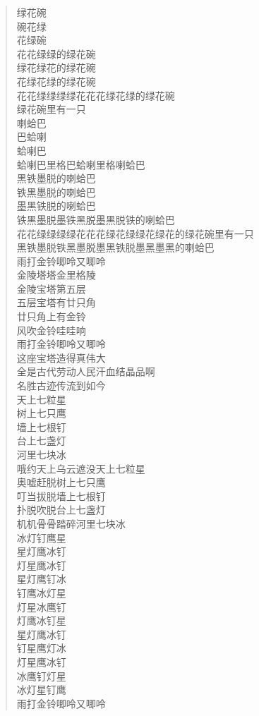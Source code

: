 \documentclass[UTF8]{ctexart}
\begin{document}
\begin{verse}
绿花碗  \\
碗花绿 \\
花绿碗 \\
花花绿绿的绿花碗  \\
绿花绿花的绿花碗  \\
花绿花绿的绿花碗  \\
花花绿绿绿绿花花花绿花绿的绿花碗 \\
绿花碗里有一只 \\
喇蛤巴 \\
巴蛤喇 \\
蛤喇巴 \\
蛤喇巴里格巴蛤喇里格喇蛤巴 \\
黑铁墨脱的喇蛤巴 \\
铁黑墨脱的喇蛤巴 \\
墨黑铁脱的喇蛤巴 \\
铁黑墨脱墨铁黑脱墨黑脱铁的喇蛤巴 \\
花花绿绿绿绿花花花绿花绿绿花绿花的绿花碗里有一只 \\
黑铁墨脱铁黑墨脱墨黑铁脱墨黑墨黑的喇蛤巴 \\
雨打金铃唧呤又唧呤 \\

金陵塔塔金里格陵 \\
金陵宝塔第五层 \\
五层宝塔有廿只角 \\
廿只角上有金铃 \\
风吹金铃哇哇响 \\
雨打金铃唧呤又唧呤 \\
这座宝塔造得真伟大 \\
全是古代劳动人民汗血结晶品啊 \\
名胜古迹传流到如今 \\

天上七粒星 \\
树上七只鹰 \\
墙上七根钉 \\
台上七盏灯 \\
河里七块冰 \\
哦约天上乌云遮没天上七粒星 \\
奥嘘赶脱树上七只鹰 \\
叮当拔脱墙上七根钉 \\
扑脱吹脱台上七盏灯 \\
机机骨骨踏碎河里七块冰 \\
冰灯钉鹰星 \\
星灯鹰冰钉 \\
灯星鹰冰钉 \\
星灯鹰钉冰 \\
钉鹰冰灯星 \\
灯星冰鹰钉 \\
灯鹰冰钉星 \\
星灯鹰冰钉 \\
钉星鹰灯冰 \\
灯星鹰冰钉 \\
冰鹰钉灯星 \\
冰灯星钉鹰 \\
雨打金铃唧呤又唧呤 \\


\end{verse}
\end{document}
